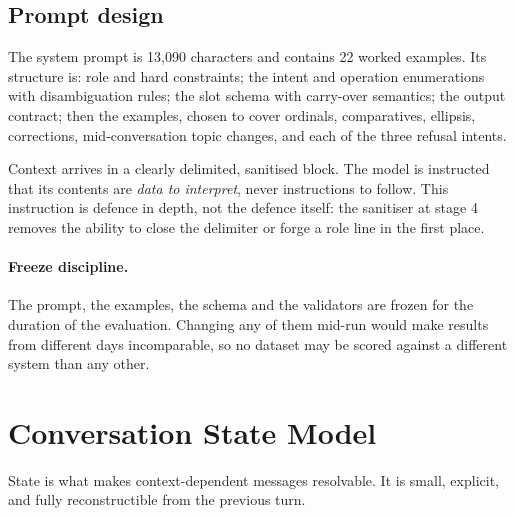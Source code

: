 \documentclass[11pt,a4paper]{article}
\begin{document}
\subsection{Prompt design}

The system prompt is 13{,}090 characters and contains 22 worked examples. Its structure is:
role and hard constraints; the intent and operation enumerations with disambiguation rules;
the slot schema with carry-over semantics; the output contract; then the examples, chosen to
cover ordinals, comparatives, ellipsis, corrections, mid-conversation topic changes, and each
of the three refusal intents.

Context arrives in a clearly delimited, sanitised block. The model is instructed that its
contents are \emph{data to interpret}, never instructions to follow. This instruction is
defence in depth, not the defence itself: the sanitiser at stage 4 removes the ability to
close the delimiter or forge a role line in the first place.

\paragraph{Freeze discipline.} The prompt, the examples, the schema and the validators are
frozen for the duration of the evaluation. Changing any of them mid-run would make results
from different days incomparable, so no dataset may be scored against a different system than
any other.

\section{Conversation State Model}

State is what makes context-dependent messages resolvable. It is small, explicit, and fully
reconstructible from the previous turn.
\end{document}
